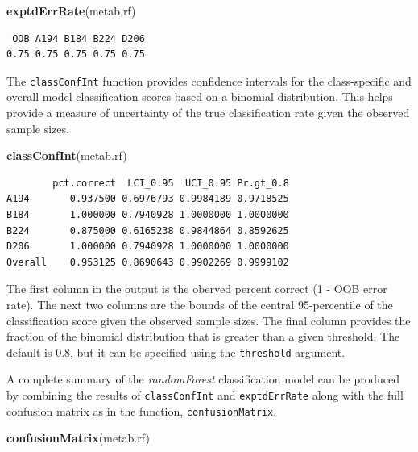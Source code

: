 \documentclass[]{article}
\newenvironment{Shaded}{\begin{snugshade}}{\end{snugshade}}
\newcommand{\KeywordTok}[1]{\textcolor[rgb]{0.13,0.29,0.53}{\textbf{{#1}}}}
\newcommand{\NormalTok}[1]{{#1}}
\begin{document}
\begin{Shaded}
\begin{Highlighting}[]
\KeywordTok{exptdErrRate}\NormalTok{(metab.rf)}
\end{Highlighting}
\end{Shaded}

\begin{verbatim}
 OOB A194 B184 B224 D206 
0.75 0.75 0.75 0.75 0.75 
\end{verbatim}

The \texttt{classConfInt} function provides confidence intervals for the
class-specific and overall model classification scores based on a
binomial distribution. This helps provide a measure of uncertainty of
the true classification rate given the observed sample sizes.

\begin{Shaded}
\begin{Highlighting}[]
\KeywordTok{classConfInt}\NormalTok{(metab.rf)}
\end{Highlighting}
\end{Shaded}

\begin{verbatim}
        pct.correct  LCI_0.95  UCI_0.95 Pr.gt_0.8
A194       0.937500 0.6976793 0.9984189 0.9718525
B184       1.000000 0.7940928 1.0000000 1.0000000
B224       0.875000 0.6165238 0.9844864 0.8592625
D206       1.000000 0.7940928 1.0000000 1.0000000
Overall    0.953125 0.8690643 0.9902269 0.9999102
\end{verbatim}

The first column in the output is the oberved percent correct (1 - OOB
error rate). The next two columns are the bounds of the central
95-percentile of the classification score given the observed sample
sizes. The final column provides the fraction of the binomial
distribution that is greater than a given threshold. The default is 0.8,
but it can be specified using the \texttt{threshold} argument.

A complete summary of the \emph{randomForest} classification model can
be produced by combining the results of \texttt{classConfInt} and
\texttt{exptdErrRate} along with the full confusion matrix as in the
function, \texttt{confusionMatrix}.

\begin{Shaded}
\begin{Highlighting}[]
\KeywordTok{confusionMatrix}\NormalTok{(metab.rf)}
\end{Highlighting}
\end{Shaded}
\end{document}
